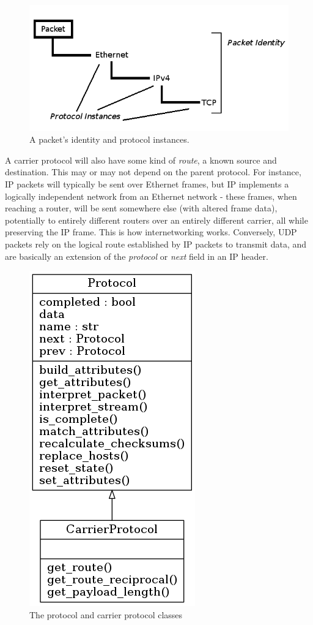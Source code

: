 \documentclass[10pt,a4paper,notitlepage]{report}
\begin{document}
\begin{figure}[H]
\center
\includegraphics[scale=0.7]{diagrams/protocol-instances.png}
\caption{A packet's identity and protocol instances.}
\end{figure}

A carrier protocol will also have some kind of \emph{route}, a known source and destination. This may or may not depend  on the parent protocol. For instance, IP packets will typically be sent over Ethernet frames, but IP implements a logically independent network from an Ethernet network - these frames, when reaching a router, will be sent somewhere else (with altered frame data), potentially to entirely different routers over an entirely different carrier, all while preserving the IP frame. This is how internetworking works. Conversely, UDP packets rely on the logical route established by IP packets to transmit data, and are basically an extension of the \emph{protocol} or \emph{next} field in an IP header.

\begin{figure}[H]
\center
\includegraphics[scale=0.7]{diagrams/protocol.png}
\caption{The protocol and carrier protocol classes}
\end{figure}
\end{document}
